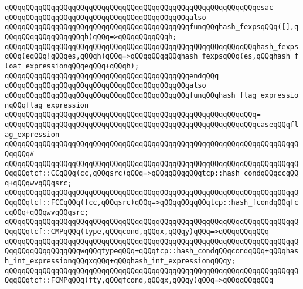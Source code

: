 \verb|qQQqqQQqqQQqqQQqqQQqqQQqqQQqqQQqqQQqqQQqqQQqqQQqqQQqqQQqqQQqesac|\newline
\newline
\verb|qQQqqQQqqQQqqQQqqQQqqQQqqQQqqQQqqQQqqQQqqQQqalso|\newline
\verb|qQQqqQQqqQQqqQQqqQQqqQQqqQQqqQQqqQQqqQQqqQQqfunqQQqhash_fexpsqQQq([],qQQqqQQqqQQqqQQqqQQqh)qQQq=>qQQqqQQqqQQqh;|\newline
\verb|qQQqqQQqqQQqqQQqqQQqqQQqqQQqqQQqqQQqqQQqqQQqqQQqqQQqqQQqqQQqhash_fexpsqQQq(eqQQq!qQQqes,qQQqh)qQQq=>qQQqqQQqqQQqhash_fexpsqQQq(es,qQQqhash_float_expressionqQQqeqQQq+qQQqh);|\newline
\verb|qQQqqQQqqQQqqQQqqQQqqQQqqQQqqQQqqQQqqQQqqQQqendqQQq|\newline
\newline
\verb|qQQqqQQqqQQqqQQqqQQqqQQqqQQqqQQqqQQqqQQqqQQqalso|\newline
\verb|qQQqqQQqqQQqqQQqqQQqqQQqqQQqqQQqqQQqqQQqqQQqfunqQQqhash_flag_expressionqQQqflag_expression|\newline
\verb|qQQqqQQqqQQqqQQqqQQqqQQqqQQqqQQqqQQqqQQqqQQqqQQqqQQqqQQqqQQq=|\newline
\verb|qQQqqQQqqQQqqQQqqQQqqQQqqQQqqQQqqQQqqQQqqQQqqQQqqQQqqQQqqQQqcaseqQQqflag_expression|\newline
\verb|qQQqqQQqqQQqqQQqqQQqqQQqqQQqqQQqqQQqqQQqqQQqqQQqqQQqqQQqqQQqqQQqqQQqqQQqqQQq#|\newline
\verb|qQQqqQQqqQQqqQQqqQQqqQQqqQQqqQQqqQQqqQQqqQQqqQQqqQQqqQQqqQQqqQQqqQQqqQQqqQQqtcf::CCqQQq(cc,qQQqsrc)qQQq=>qQQqqQQqqQQqtcp::hash_condqQQqccqQQq+qQQqwvqQQqsrc;|\newline
\verb|qQQqqQQqqQQqqQQqqQQqqQQqqQQqqQQqqQQqqQQqqQQqqQQqqQQqqQQqqQQqqQQqqQQqqQQqqQQqtcf::FCCqQQq(fcc,qQQqsrc)qQQq=>qQQqqQQqqQQqtcp::hash_fcondqQQqfccqQQq+qQQqwvqQQqsrc;|\newline
\newline
\verb|qQQqqQQqqQQqqQQqqQQqqQQqqQQqqQQqqQQqqQQqqQQqqQQqqQQqqQQqqQQqqQQqqQQqqQQqqQQqtcf::CMPqQQq(type,qQQqcond,qQQqx,qQQqy)qQQq=>qQQqqQQqqQQq|\newline
\verb|qQQqqQQqqQQqqQQqqQQqqQQqqQQqqQQqqQQqqQQqqQQqqQQqqQQqqQQqqQQqqQQqqQQqqQQqqQQqqQQqqQQqqQQqwqQQqtypeqQQq+qQQqtcp::hash_condqQQqcondqQQq+qQQqhash_int_expressionqQQqxqQQq+qQQqhash_int_expressionqQQqy;|\newline
\newline
\verb|qQQqqQQqqQQqqQQqqQQqqQQqqQQqqQQqqQQqqQQqqQQqqQQqqQQqqQQqqQQqqQQqqQQqqQQqqQQqtcf::FCMPqQQq(fty,qQQqfcond,qQQqx,qQQqy)qQQq=>qQQqqQQqqQQq|\newline

